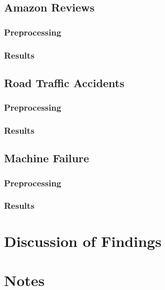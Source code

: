 \documentclass{article}
\begin{document}
\subsection{Amazon Reviews}
\subsubsection{Preprocessing}
\subsubsection{Results}

\subsection{Road Traffic Accidents}
\subsubsection{Preprocessing}
\subsubsection{Results}

\subsection{Machine Failure}
\subsubsection{Preprocessing}
\subsubsection{Results}


\section{Discussion of Findings}



\section{Notes}
\end{document}
